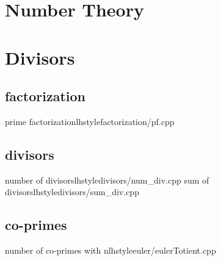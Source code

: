 \section{Number Theory}
    \section{Divisors}
      \subsection{factorization}
         {prime factorization}{lhstyle}{factorization/pf.cpp}
      \subsection{divisors}
         {number of divisors}{lhstyle}{divisors/num_div.cpp}
         {sum of divisors}{lhstyle}{divisors/sum_div.cpp}
      \subsection{co-primes}
         {number of co-primes with n}{lhstyle}{euler/eulerTotient.cpp}

